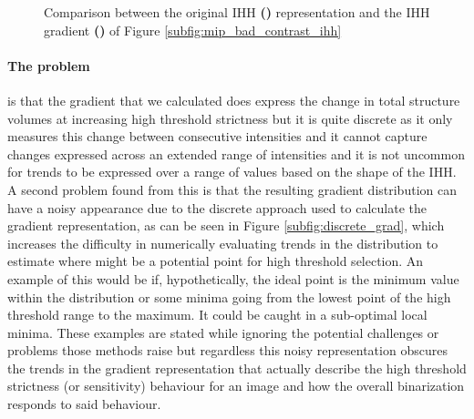 \begin{figure}
    \centering
    \caption[Comparison between the original IHH representation and the IHH gradient of Figure \ref{subfig:mip_bad_contrast_ihh}]{Comparison between the original IHH \textbf{()} representation and the IHH gradient \textbf{()} of Figure \ref{subfig:mip_bad_contrast_ihh}}
    \label{fig:ihh_grad_compare}
\end{figure}
\paragraph{The problem} is that the gradient that we calculated does express the change in total structure volumes at increasing high threshold strictness but it is quite discrete as it only measures this change between consecutive intensities and it cannot capture changes expressed across an extended range of intensities and it is not uncommon for trends to be expressed over a range of values based on the shape of the IHH. A second problem found from this is that the resulting gradient distribution can have a noisy appearance due to the discrete approach used to calculate the gradient representation, as can be seen in Figure \ref{subfig:discrete_grad},  which increases the difficulty in numerically evaluating trends in the distribution to estimate where might be a potential point for high threshold selection. An example of this would be if, hypothetically, the ideal point is the minimum value within the distribution or some minima going from the lowest point of the high threshold range to the maximum. It could be caught in a sub-optimal local minima. These examples are stated while ignoring the potential challenges or problems those methods raise but regardless this noisy representation obscures the trends in the gradient representation that actually describe the high threshold strictness (or sensitivity) behaviour for an image and how the overall binarization responds to said behaviour.

